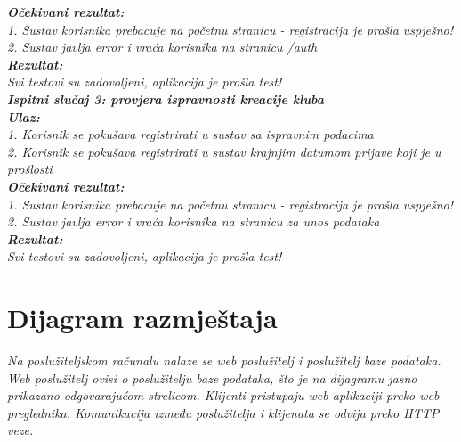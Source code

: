			  \textbf{\textit{Očekivani rezultat:}}\\
 
			  \textit{1. Sustav korisnika prebacuje na početnu stranicu - registracija je prošla uspješno!}\\
			  \textit{2. Sustav javlja error i vraća korisnika na stranicu /auth}\\
 
			  \textbf{\textit{Rezultat:}}\\
			  \textit{Svi testovi su zadovoljeni, aplikacija je prošla test!}\\

			  \textbf{\textit{Ispitni slučaj 3: provjera ispravnosti kreacije kluba}}\\
             \textbf{\textit{Ulaz:}}\\
             
              \textit{1. Korisnik se pokušava registrirati u sustav sa ispravnim podacima}\\
              \textit{2. Korisnik se pokušava registrirati u sustav krajnjim datumom prijave koji je u prošlosti}\\
 
              \textbf{\textit{Očekivani rezultat:}}\\
 
              \textit{1. Sustav korisnika prebacuje na početnu stranicu - registracija je prošla uspješno!}\\
              \textit{2. Sustav javlja error i vraća korisnika na stranicu za unos podataka}\\
 
              \textbf{\textit{Rezultat:}}\\
              \textit{Svi testovi su zadovoljeni, aplikacija je prošla test!}\\
			 
			
			\eject 
		
		
		\section{Dijagram razmještaja}
			
			
			 \textit{Na poslužiteljskom računalu nalaze se web poslužitelj i poslužitelj baze podataka. Web poslužitelj ovisi o poslužitelju baze podataka, što je na dijagramu jasno prikazano odgovarajućom strelicom. Klijenti pristupaju web aplikaciji preko web preglednika. Komunikacija između poslužitelja i klijenata se odvija preko HTTP veze.}
			
